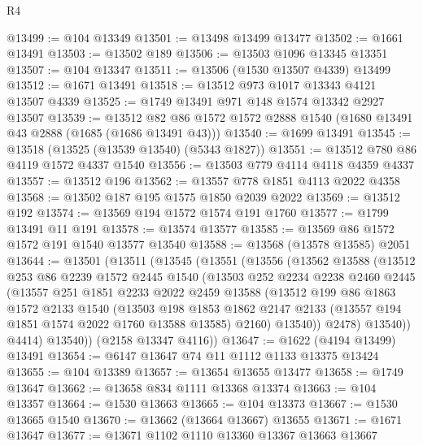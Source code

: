 \begin{lexlean}{R4}
\begin{coremodule}
@13499 := @104 @13349
@13501 := @13498 @13499 @13477
@13502 := @1661 @13491
@13503 := @13502 @189
@13506 := @13503 @1096 @13345 @13351
@13507 := @104 @13347
@13511 := @13506 (@1530 @13507 @4339) @13499
@13512 := @1671 @13491
@13518 := @13512 @973 @1017 @13343 @4121 @13507 @4339
@13525 := @1749 @13491 @971 @148 @1574 @13342 @2927 @13507
@13539 := @13512 @82 @86 @1572 @1572 @2888 @1540 (@1680 @13491 @43 @2888 (@1685 (@1686 @13491 @43)))
@13540 := @1699 @13491
@13545 := @13518 (@13525 (@13539 @13540) (@5343 @1827))
@13551 := @13512 @780 @86 @4119 @1572 @4337 @1540
@13556 := @13503 @779 @4114 @4118 @4359 @4337
@13557 := @13512 @196
@13562 := @13557 @778 @1851 @4113 @2022 @4358
@13568 := @13502 @187 @195 @1575 @1850 @2039 @2022
@13569 := @13512 @192
@13574 := @13569 @194 @1572 @1574 @191 @1760
@13577 := @1799 @13491 @11 @191
@13578 := @13574 @13577
@13585 := @13569 @86 @1572 @1572 @191 @1540 @13577 @13540
@13588 := @13568 (@13578 @13585) @2051
@13644 := @13501
    (@13511
      (@13545
        (@13551
          (@13556
            (@13562
              @13588
              (@13512
                @253
                @86
                @2239
                @1572
                @2445
                @1540
                (@13503
                  @252
                  @2234
                  @2238
                  @2460
                  @2445
                  (@13557
                    @251
                    @1851
                    @2233
                    @2022
                    @2459
                    @13588
                    (@13512
                      @199
                      @86
                      @1863
                      @1572
                      @2133
                      @1540
                      (@13503
                        @198
                        @1853
                        @1862
                        @2147
                        @2133
                        (@13557 @194 @1851 @1574 @2022 @1760 @13588 @13585)
                        @2160)
                      @13540))
                  @2478)
                @13540))
            @4414)
          @13540))
      (@2158 @13347 @4116))
@13647 := @1622 (@4194 @13499) @13491
@13654 := @6147 @13647 @74 @11 @1112 @1133 @13375 @13424
@13655 := @104 @13389
@13657 := @13654 @13655 @13477
@13658 := @1749 @13647
@13662 := @13658 @834 @1111 @13368 @13374
@13663 := @104 @13357
@13664 := @1530 @13663
@13665 := @104 @13373
@13667 := @1530 @13665 @1540
@13670 := @13662 (@13664 @13667) @13655
@13671 := @1671 @13647
@13677 := @13671 @1102 @1110 @13360 @13367 @13663 @13667

\end{coremodule}
\end{lexlean}
